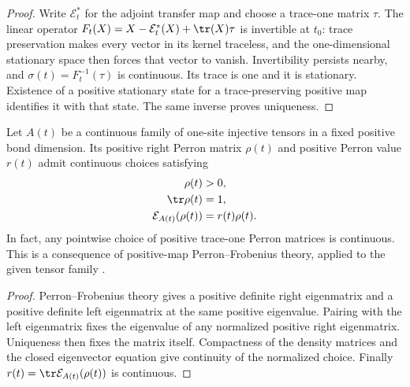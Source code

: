 \begin{proof}\leanok
    Write $\mathcal E_t^*$ for the adjoint transfer map and choose a
    trace-one matrix $\tau$. The linear operator
    $F_t(X)=X-\mathcal E_t^*(X)+\tr(X)\tau$ is invertible at $t_0$:
    trace preservation makes every vector in its kernel traceless, and
    the one-dimensional stationary space then forces that vector to vanish.
    Invertibility persists nearby, and $\sigma(t)=F_t^{-1}(\tau)$ is
    continuous. Its trace is one and it is stationary. Existence of a
    positive stationary state for a trace-preserving positive map
    identifies it with that state. The same inverse proves uniqueness.
\end{proof}

\begin{lemma}
    \label{thm:spt_continuous_right_perron_data}
    \leanok
    Let $A(t)$ be a continuous family of one-site injective tensors
    in a fixed positive bond dimension. Its positive right Perron
    matrix $\rho(t)$ and positive Perron value $r(t)$ admit continuous
    choices satisfying
    \begin{align}
        \rho(t)                    & >0, \notag           \\
        \tr\rho(t)                 & =1, \notag           \\
        \mathcal E_{A(t)}(\rho(t)) & =r(t)\rho(t). \notag
    \end{align}
    In fact, any pointwise choice of positive trace-one Perron matrices
    is continuous. This is a consequence of positive-map
    Perron--Frobenius theory, applied to the given tensor family
    \cite[Theorem~6.3]{Wolf2012Quantum}.
\end{lemma}

\begin{proof}\leanok
    Perron--Frobenius theory gives a positive definite right eigenmatrix
    and a positive definite left eigenmatrix at the same positive
    eigenvalue. Pairing with the left eigenmatrix fixes the eigenvalue
    of any normalized positive right eigenmatrix. Uniqueness then fixes
    the matrix itself. Compactness of the density matrices and the
    closed eigenvector equation give continuity of the normalized choice.
    Finally $r(t)=\tr\mathcal E_{A(t)}(\rho(t))$ is continuous.
\end{proof}

